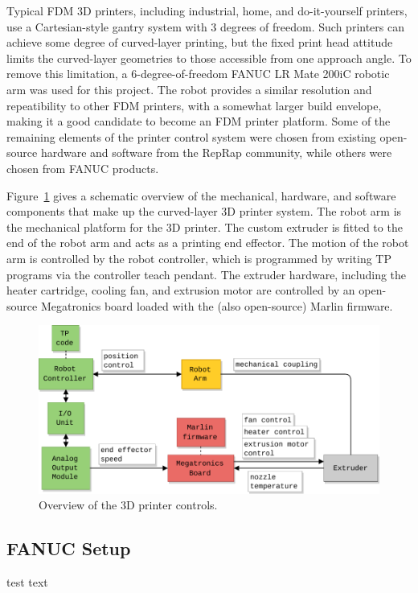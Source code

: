 Typical FDM 3D printers, including industrial, home, and do-it-yourself printers, use a Cartesian-style gantry system with 3 degrees of freedom. Such printers can achieve some degree of curved-layer printing, but the fixed print head attitude limits the curved-layer geometries to those accessible from one approach angle. To remove this limitation, a 6-degree-of-freedom FANUC LR Mate 200iC robotic arm was used for this project. The robot provides a similar resolution and repeatibility to other FDM printers, with a somewhat larger build envelope, making it a good candidate to become an FDM printer platform. Some of the remaining elements of the printer control system were chosen from existing open-source hardware and software from the RepRap community, while others were chosen from FANUC products.

Figure~\ref{fig:sys-overview} gives a schematic overview of the mechanical, hardware, and software components that make up the curved-layer 3D printer system. The robot arm is the mechanical platform for the 3D printer. The custom extruder is fitted to the end of the robot arm and acts as a printing end effector. The motion of the robot arm is controlled by the robot controller, which is programmed by writing TP programs via the controller teach pendant. The extruder hardware, including the heater cartridge, cooling fan, and extrusion motor are controlled by an open-source Megatronics board loaded with the (also open-source) Marlin firmware. 

\begin{figure}[t]
    \centering
    \includegraphics[width=.8\linewidth]{figures/diagrams/system overview}
    \caption{Overview of the 3D printer controls.}
    \label{fig:sys-overview}
\end{figure}

\subsection*{FANUC Setup}

test text\\
